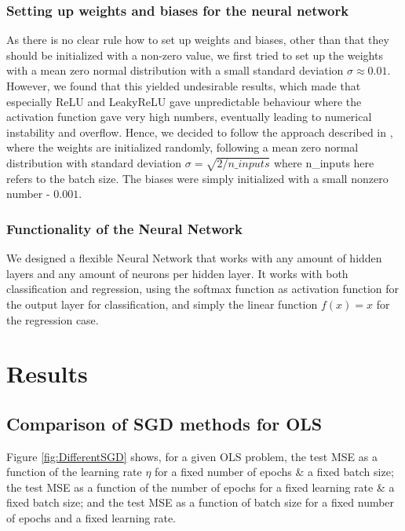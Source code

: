 \documentclass[11pt,a4paper,titlepage]{article}
\begin{document}
\subsubsection{Setting up weights and biases for the neural network}
As there is no clear rule how to set up weights and biases, other than that they should be initialized with a non-zero value, we first tried to set up the weights with a mean zero normal distribution with a small standard deviation $\sigma\approx0.01$. However, we found that this yielded undesirable results, which made that especially ReLU and LeakyReLU gave unpredictable behaviour where the activation function gave very high numbers, eventually leading to numerical instability and overflow. Hence, we decided to follow the approach described in \cite{DelvingDeep}, where the weights are initialized randomly, following a mean zero normal distribution with standard deviation $\sigma=\sqrt{2/n\_inputs}$ where n\_inputs here refers to the batch size. The biases were simply initialized with a small nonzero number - $0.001$.
\subsubsection{Functionality of the Neural Network}
We designed a flexible Neural Network that works with any amount of hidden layers and any amount of neurons per hidden layer. It works with both classification and regression, using the softmax function as activation function for the output layer for classification, and simply the linear function $f(x)=x$ for the regression case. 
\section{Results}
\subsection{Comparison of SGD methods for OLS}
Figure \ref{fig:DifferentSGD} shows, for a given OLS problem, the test MSE as a function of the learning rate $\eta$ for a fixed number of epochs \& a fixed batch size; the test MSE as a function of the number of epochs for a fixed learning rate \& a fixed batch size; and the test MSE as a function of batch size for a fixed number of epochs and a fixed learning rate. 
\end{document}
